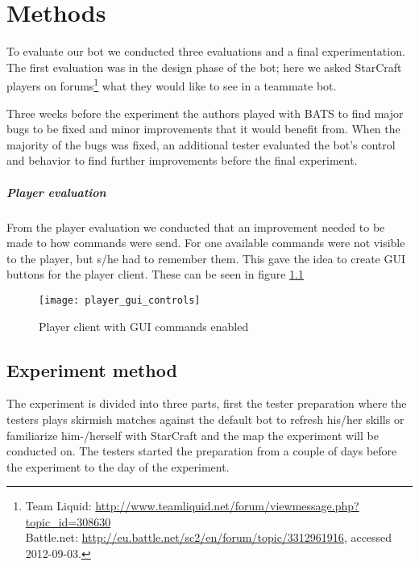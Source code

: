 \chapter{Methods}
To evaluate our bot we conducted three evaluations and a final experimentation. The first evaluation
was in the design phase of the bot; here we asked StarCraft players on forums\footnote{ Team Liquid:
\url{http://www.teamliquid.net/forum/viewmessage.php?topic\_id=308630}\\ Battle.net:
\url{http://eu.battle.net/sc2/en/forum/topic/3312961916}, accessed 2012-09-03.} what they would like
to see in a teammate bot.

Three weeks before the experiment the authors played with BATS to find major bugs to be fixed and
minor improvements that it would benefit from. When the majority of the bugs was fixed, an additional
tester evaluated the bot’s control and behavior to find further improvements before the final experiment.

\paragraph{Player evaluation}
From the player evaluation we conducted that an improvement needed to be made to how commands were
send. For one available commands were not visible to the player, but s/he had to remember them.
This gave the idea to create GUI buttons for the player client. These can be seen in figure
\ref{fig:player_commands_gui}

\begin{figure}[htb]
\centering
\texttt{[image: player\_gui\_controls]}
\caption{Player client with GUI commands enabled}
\label{fig:player_commands_gui}
\end{figure}

\section{Experiment method}
The experiment is divided into three parts, first the tester preparation where the testers plays
skirmish matches against the default bot to refresh his/her skills or familiarize him-/herself with
StarCraft and the map the experiment will be conducted on. The testers started the preparation
from a couple of days before the experiment to the day of the experiment.

